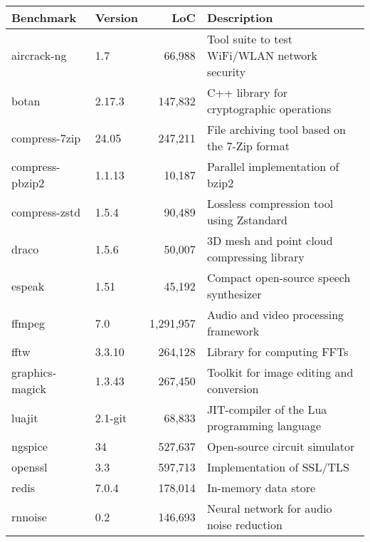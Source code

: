 \documentclass[a4paper,12pt]{article}
\begin{document}
\begin{table}[t]
  \centering
  \begin{tabular}{|l|l|r|l|}
    \hline
    \textbf{Benchmark} & \textbf{Version} & \textbf{LoC} & \textbf{Description}                                         \\
    \hline
    aircrack-ng        & 1.7              & 66,988        & Tool suite to test WiFi/WLAN network security           \\
    \hline
    botan              & 2.17.3           & 147,832       & C++ library for cryptographic operations                    \\
    \hline
    compress-7zip      & 24.05            & 247,211       & File archiving tool based on the 7-Zip format               \\
    \hline
    compress-pbzip2    & 1.1.13           & 10,187        & Parallel implementation of bzip2 \\
    \hline
    compress-zstd      & 1.5.4            & 90,489        & Lossless compression tool using Zstandard                   \\
    \hline
    draco              & 1.5.6            & 50,007        & 3D mesh and point cloud compressing library   \\
    \hline
    espeak             & 1.51             & 45,192        & Compact open-source speech synthesizer                      \\
    \hline
    ffmpeg             & 7.0              & 1,291,957      & Audio and video processing framework        \\
    \hline
    fftw               & 3.3.10           & 264,128       & Library for computing FFTs\\
    \hline
    graphics-magick    & 1.3.43           & 267,450       & Toolkit for image editing and conversion                    \\
    \hline
    luajit             & 2.1-git          & 68,833        & JIT-compiler of the Lua programming language        \\
    \hline
    ngspice            & 34               & 527,637       & Open-source circuit simulator    \\
    \hline
    openssl            & 3.3              & 597,713       & Implementation of SSL/TLS \\
    \hline
    redis              & 7.0.4            & 178,014       & In-memory data store  \\
    \hline
    rnnoise            & 0.2              & 146,693       & Neural network for audio noise reduction  \\

\end{tabular}
\end{table}
\end{document}
